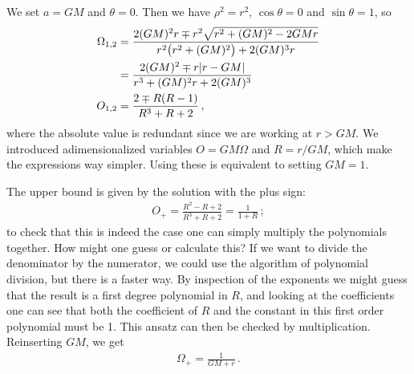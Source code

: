 \documentclass[main.tex]{subfiles}
\begin{document}
We set \(a = GM\) and \(\theta  = 0\). Then we have \(\rho^2= r^2\), \(\cos \theta = 0\) and \(\sin \theta =1\), so
%
\begin{align}
\Omega_{1, 2} &= \frac{2 (GM)^2 r \mp r^2\sqrt{r^2 + (GM)^2 - 2GMr}}{r^2 \qty(r^2 +(GM)^2) + 2 (GM)^3 r}  \\
&= \frac{2 (GM)^2 \mp r \abs{r - GM}}{r^3+(GM)^2r + 2 (GM)^3} \\
O_{1,2}&= \frac{2 \mp R (R-1)}{R^3+R + 2}
\,,
\end{align}
%
where the absolute value is redundant since we are working at \(r > GM\).
We introduced adimensionalized variables \(O = GM \Omega \) and \(R = r/GM\), which make the expressions way simpler. Using these is equivalent to setting \(GM = 1\). 

The upper bound is given by the solution with the plus sign: 
%
\begin{align}
O_{+} = \frac{R^2 - R + 2}{R^3+ R  + 2} = \frac{1}{1 + R}
\,;
\end{align}
%
to check that this is indeed the case one can simply multiply the polynomials together. 
How might one guess or calculate this? If we want to divide the denominator by the numerator, we could use the algorithm of polynomial division, but there is a faster way. By inspection of the exponents we might guess that the result is a first degree polynomial in \(R\), and looking at the coefficients one can see that both the coefficient of \(R\) and the constant in this first order polynomial must be 1. This ansatz can then be checked by multiplication. Reinserting \(GM\), we get 
%
\begin{align}
\Omega_{+} = \frac{1}{GM + r}
\,.
\end{align}
%
\end{document}
